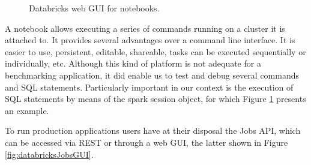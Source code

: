 \begin{figure}
   \begin{center}
   \end{center}
   \caption{Databricks web GUI for notebooks.}
   \label{fig:databricksNotebookGUI}
\end{figure}

A notebook allows executing a series of commands running on a cluster it is attached to. It provides several advantages over a command line interface. It is easier to use, persistent, editable, shareable, tasks can be executed sequentially or individually, etc. Although this kind of platform is not adequate for a benchmarking application, it did enable us to test and debug several commands and SQL statements. Particularly important in our context is the execution of SQL statements by means of the spark session object, for which Figure \ref{fig:databricksNotebookGUI} presents an example.

To run production applications users have at their disposal the Jobs API, which can be accessed via REST or through a web GUI, the latter shown in Figure \ref{fig:databricksJobsGUI}.

